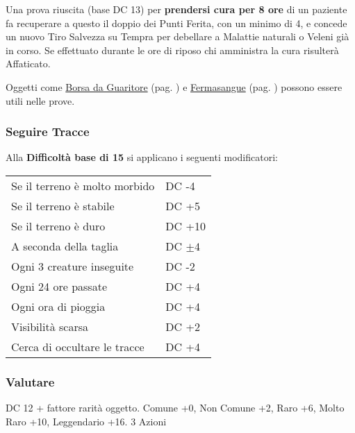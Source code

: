 \begin{multicols}{2}
Una prova riuscita (base DC 13) per \textbf{prendersi cura per 8 ore} di un paziente fa recuperare a questo il doppio dei Punti Ferita, con un minimo di 4, e concede un nuovo Tiro Salvezza su Tempra per debellare a Malattie naturali o Veleni già in corso.
Se effettuato durante le ore di riposo chi amministra la cura risulterà Affaticato.

Oggetti come \hyperlink{borsadaguaritore}{Borsa da Guaritore} (pag. \pageref{borsadaguaritore}) e \hyperlink{Fermasangue}{Fermasangue} (pag. \pageref{fermasangue}) possono essere utili nelle prove.

\titlespacing*{\subsubsection}{0pt}{0.5em}{0.5em}\subsubsection*{Seguire Tracce}\label{seguiretracce}

Alla \textbf{Difficoltà base di 15} si applicano i seguenti modificatori:

\medskip

\noindent\begin{tabularx}{\linewidth}{ll}
	Se il terreno è molto morbido& DC -4\\
	Se il terreno è stabile& DC +5\\
	Se il terreno è duro& DC +10\\
	A seconda della taglia& DC $\pm4$\\
	Ogni 3 creature inseguite& DC -2\\
	Ogni 24 ore passate& DC +4\\
	Ogni ora di pioggia& DC +4\\
	Visibilità scarsa& DC +2\\
	Cerca di occultare le tracce& DC +4
\end{tabularx}

\titlespacing*{\subsubsection}{0pt}{0.5em}{0.5em}\subsubsection*{Valutare}\label{compvalutare}
DC 12 + fattore rarità oggetto. Comune +0, Non Comune +2, Raro +6, Molto Raro +10, Leggendario +16. 3 Azioni


\end{multicols}
